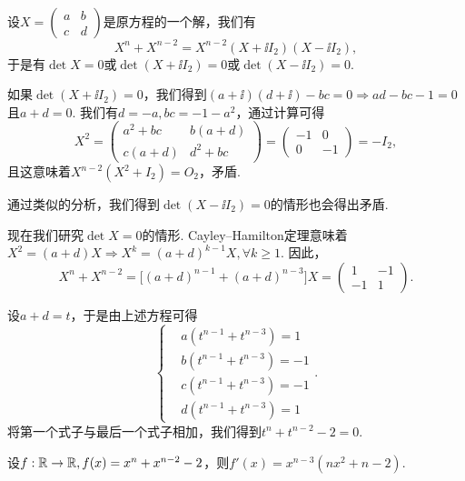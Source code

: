 \begin{solution}
  设$X=\begin{pmatrix}
    a & b \\
    c & d
  \end{pmatrix}$是原方程的一个解，我们有
  \[
    X^n + X^{n-2} = X^{n-2}(X + \ii I_2)(X - \ii I_2),
  \]
  于是有$\det X=0$或$\det(X+\ii I_2)=0$或$\det(X-\ii I_2)=0$.

  如果$\det(X+\ii I_2)=0$，我们得到$(a+\ii)(d+\ii)-bc=0\Rightarrow ad-bc-1=0$且$a+d=0$. 我们有$d=-a,bc=-1-a^2$，通过计算可得
  \[
    X^2 = \begin{pmatrix}
      a^2 + bc & b(a + d) \\
      c(a + d) & d^2 + bc
    \end{pmatrix} = \begin{pmatrix}
      -1 & 0 \\
      0 & -1
    \end{pmatrix} = -I_2,
  \]
  且这意味着$X^{n-2}(X^2+I_2)=O_2$，矛盾.

  通过类似的分析，我们得到$\det(X-\ii I_2)=0$的情形也会得出矛盾.

  现在我们研究$\det X=0$的情形. Cayley--Hamilton定理意味着$X^2=(a+d)X\Rightarrow X^k=(a+d)^{k-1}X,\forall k\ge1$. 因此，
  \[
    X^n + X^{n-2} = \big[ (a+d)^{n-1} + (a+d)^{n-3} \big] X = \begin{pmatrix}
      1 & -1 \\
      -1 & 1
    \end{pmatrix}.
  \]

  设$a+d=t$，于是由上述方程可得
  \[
    \left\{
      \begin{aligned}
        & a(t^{n-1} + t^{n-3}) = 1 \\
        & b(t^{n-1} + t^{n-3}) = -1 \\
        & c(t^{n-1} + t^{n-3}) = -1 \\
        & d(t^{n-1} + t^{n-3}) = 1
      \end{aligned}
    \right..
  \]
  将第一个式子与最后一个式子相加，我们得到$t^n+t^{n-2}-2=0$.

  设$f:\mathbb R\to\mathbb R,f(x)=x^n+x^{n-2}-2$，则$f'(x)=x^{n-3}(nx^2+n-2)$.


\end{solution}
